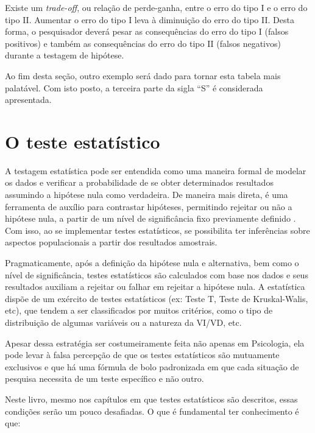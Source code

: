 \documentclass[
]{book}
\begin{document}
Existe um \emph{trade-off}, ou relação de perde-ganha, entre o erro do tipo I e o erro do tipo II. Aumentar o erro do tipo I leva à diminuição do erro do tipo II. Desta forma, o pesquisador deverá pesar as consequências do erro do tipo I (falsos positivos) e também as consequências do erro do tipo II (falsos negativos) durante a testagem de hipótese.

Ao fim desta seção, outro exemplo será dado para tornar esta tabela mais palatável. Com isto posto, a terceira parte da sigla ``S'' é considerada apresentada.

\hypertarget{o-teste-estatuxedstico}{%
\section{O teste estatístico}\label{o-teste-estatuxedstico}}

A testagem estatística pode ser entendida como uma maneira formal de modelar os dados e verificar a probabilidade de se obter determinados resultados assumindo a hipótese nula como verdadeira. De maneira mais direta, é uma ferramenta de auxílio para contrastar hipóteses, permitindo rejeitar ou não a hipótese nula, a partir de um nível de significância fixo previamente definido \citep{Lecoutre2014}. Com isso, ao se implementar testes estatísticos, se possibilita ter inferências sobre aspectos populacionais a partir dos resultados amostrais.

Pragmaticamente, após a definição da hipótese nula e alternativa, bem como o nível de significância, testes estatísticos são calculados com base nos dados e seus resultados auxiliam a rejeitar ou falhar em rejeitar a hipótese nula. A estatística dispõe de um exército de testes estatísticos (ex: Teste T, Teste de Kruskal-Walis, etc), que tendem a ser classificados por muitos critérios, como o tipo de distribuição de algumas variáveis ou a natureza da VI/VD, etc.

Apesar dessa estratégia ser costumeiramente feita não apenas em Psicologia, ela pode levar à falsa percepção de que os testes estatísticos são mutuamente exclusivos e que há uma fórmula de bolo padronizada em que cada situação de pesquisa necessita de um teste específico e não outro.

Neste livro, mesmo nos capítulos em que testes estatísticos são descritos, essas condições serão um pouco desafiadas. O que é fundamental ter conhecimento é que:
\end{document}
